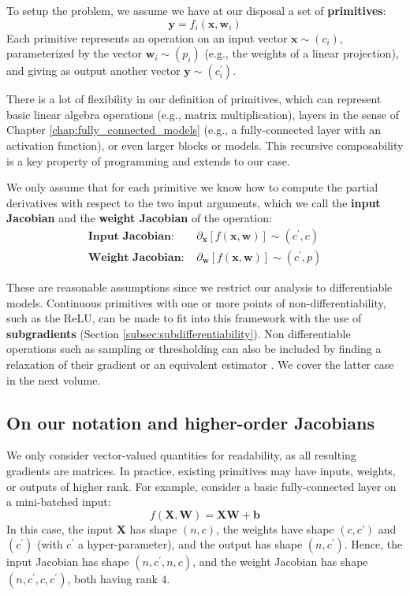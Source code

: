 To setup the problem, we assume we have at our disposal a set of \textbf{primitives}:
%
$$
\mathbf{y} =f_i(\mathbf{x}, \mathbf{w}_i)
$$
%
Each primitive represents an operation on an input vector $\mathbf{x} \sim ({c_i})$, parameterized by the vector $\mathbf{w}_i \sim (p_i)$ (e.g., the weights of a linear projection), and giving as output another vector $\mathbf{y} \sim (c^\prime_i)$.

There is a lot of flexibility in our definition of primitives, which can represent basic linear algebra operations (e.g., matrix multiplication), layers in the sense of Chapter \ref{chap:fully_connected_models} (e.g., a fully-connected layer with an activation function), or even larger blocks or models. This recursive composability is a key property of programming and extends to our case.

We only assume that for each primitive we know how to compute the partial derivatives with respect to the two input arguments, which we call the \textbf{input Jacobian} and the \textbf{weight Jacobian} of the operation:
%
\begin{eqnarray*}
\textbf{Input Jacobian: } & \partial_{\mathbf{x}}\left[f(\mathbf{x},\mathbf{w})\right] \sim (c^\prime,c) \\ 
\textbf{Weight Jacobian: } & \partial_{\mathbf{w}}\left[f(\mathbf{x},\mathbf{w})\right] \sim (c^\prime,p) 
\end{eqnarray*}

These are reasonable assumptions since we restrict our analysis to differentiable models. Continuous primitives with one or more points of non-differentiability, such as the ReLU, can be made to fit into this framework with the use of \textbf{subgradients} (Section \ref{subsec:subdifferentiability}). Non differentiable operations such as sampling or thresholding can also be included by finding a relaxation of their gradient or an equivalent estimator \cite{niculae2023discrete}. We cover the latter case in the next volume.
%
\subsection*{On our notation and higher-order Jacobians}

\addteacup We only consider vector-valued quantities for readability, as all resulting gradients are matrices. In practice, existing primitives may have inputs, weights, or outputs of higher rank. For example, consider a basic fully-connected layer on a mini-batched input:
%
$$
f(\mathbf{X},\mathbf{W})=\mathbf{X}\mathbf{W}+\mathbf{b}
$$
%
In this case, the input $\mathbf{X}$ has shape $(n,c)$, the weights have shape $(c,c’)$ and $(c^\prime)$ (with $c^\prime$ a hyper-parameter), and the output has shape $(n, c^\prime)$. Hence, the input Jacobian has shape $(n,c^\prime, n, c)$, and the weight Jacobian has shape $(n,c^\prime, c, c^\prime)$, both having rank $4$. 

